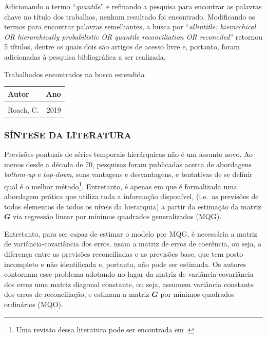 \documentclass[
  12pt,
  oneside,
  a4paper,
  chapter=TITLE,
  section=TITLE,
  subsubsection=TITLE,
  brazil]{abntex2}
\begin{document}
Adicionando o termo ``\emph{quantile}'' e refinando a pesquisa para
encontrar as palavras chave no título dos trabalhos, nenhum resultado
foi encontrado. Modificando os termos para encontrar palavras
semelhantes, a busca por ``\emph{allintitle: hierarchical OR
hierarchically probabilistic OR quantile reconciliation OR reconciled}''
retornou 5 títulos, dentre os quais dois são artigos de acesso livre e,
portanto, foram adicionadas à pesquisa bibliográfica a ser realizada.
\nocite{han2021, roach2019}

\begin{quadro}
\caption{Trabalhados encontrados na busca estendida}\tabularnewline

\centering\begingroup\fontsize{10}{12}\selectfont

\begin{tabular}[t]{lr}
\toprule
Autor & Ano\\
\midrule
\cellcolor{gray!6}{Han, X., Dasgupta, S., Ghosh, J.} & \cellcolor{gray!6}{2021}\\
Roach, C. & 2019\\
\bottomrule
\end{tabular}
\endgroup{}
\end{quadro}

\hypertarget{suxedntese-da-literatura}{%
\subsubsection{SÍNTESE DA LITERATURA}\label{suxedntese-da-literatura}}

Previsões pontuais de séries temporais hierárquicas não é um assunto
novo. Ao menos desde a década de 70, pesquisas foram publicadas acerca
de abordagens \emph{bottom-up} e \emph{top-down}, suas vantagens e
desvantagens, e tentativas de se definir qual é o melhor
método\footnote{Uma revisão dessa literatura pode ser encontrada em
  \textcite{athanasopoulos2009}.}. Entretanto, é apenas em
\textcite{hyndman2011} que é formalizada uma abordagem prática que
utiliza toda a informação disponível, (i.e.~as previsões de todos
elementos de todos os níveis da hierarquia) a partir da estimação da
matriz \(\mathbfit{G}\) via regressão linear por mínimos quadrados
generalizados (MQG).

Entretanto, para ser capaz de estimar o modelo por MQG, é necessária a
matriz de variância-covariância dos erros. \textcite{hyndman2011} usam a
matriz de erros de coerência, ou seja, a diferença entre as previsões
reconciliadas e as previsões base, que tem posto incompleto e não
identificada e, portanto, não pode ser estimada. Os autores contornam
esse problema adotando no lugar da matriz de variância-covariância dos
erros uma matriz diagonal constante, ou seja, assumem variância
constante dos erros de reconciliação, e estimam a matriz
\(\mathbfit{G}\) por mínimos quadrados ordinários (MQO).
\end{document}
